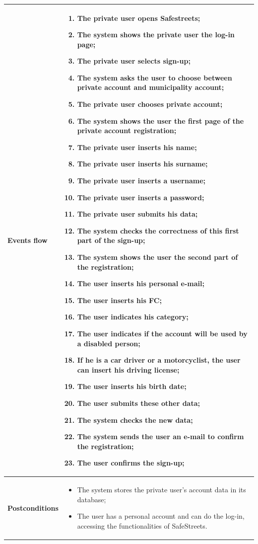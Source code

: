 \documentclass[titlepage]{article}
\begin{document}
\begin{longtable}{| p{3 cm} | p{10 cm} |}
\textbf{Events flow} & 
\begin{enumerate}
	\item The private user opens Safestreets;
	\item The system shows the private user the log-in page;
	\item The private user selects sign-up;
	\item The system asks the user to choose between private account and municipality account;
	\item The private user chooses private account;
	\item The system shows the user the first page of the private account registration;
	\item The private user inserts his name;
	\item The private user inserts his surname;
	\item The private user inserts a username;
	\item The private user inserts a password;
	\item The private user submits his data;
	\item The system checks the correctness of this first part of the sign-up;
	\item The system shows the user the second part of the registration;
	\item The user inserts his personal e-mail;
	\item The user inserts his FC;
	\item The user indicates his category;
	\item The user indicates if the account will be used by a disabled person;
	\item If he is a car driver or a motorcyclist, the user can insert his driving license;
	\item The user inserts his birth date;
	\item The user submits these other data;
	\item The system checks the new data;
	\item The system sends the user an e-mail to confirm the registration;
	\item The user confirms the sign-up;
\end{enumerate} \\ \hline
\textbf{Postconditions} & 
\begin{itemize}
\item The system stores the private user's account data in its database;
\item The user has a personal account and can do the log-in, accessing the functionalities of SafeStreets.
\end{itemize} \\ \hline


\end{longtable}
\end{document}
